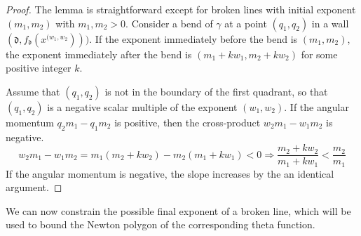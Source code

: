 \documentclass[10pt]{amsart}
\theoremstyle{remark}
\numberwithin{equation}{section}
\newcommand{\fd}{\mathfrak{d}}
\begin{document}
\begin{proof}
The lemma is straightforward except for broken lines with initial exponent $(m_1,m_2)$ with $m_1,m_2>0$.  
Consider a bend of $\gamma$ at a point $(q_1,q_2)$ in a wall $(\fd,f_{\fd}(x^{(w_1,w_2})))$.  If the exponent immediately before the bend is $(m_1,m_2)$, the exponent immediately after the bend is $(m_1+kw_1,m_2+kw_2)$ for some positive integer $k$.  

Assume that $(q_1,q_2)$ is not in the boundary of the first quadrant, so that $(q_1,q_2)$ is a negative scalar multiple of the exponent $(w_1,w_2)$. If the angular momentum $q_2m_1-q_1m_2$ is positive, then the cross-product $w_2m_1-w_1m_2$ is negative. 
\[ w_2m_1-w_1m_2=m_1(m_2+kw_2)-m_2(m_1+kw_1)<0 \Rightarrow \frac{m_2+kw_2}{m_1+kw_1} < \frac{m_2}{m_1}\]
If the angular momentum is negative, the slope increases by the an identical argument.
\end{proof}

We can now constrain the possible final exponent of a broken line, which will be used to bound the Newton polygon of the corresponding theta function.
\end{document}
